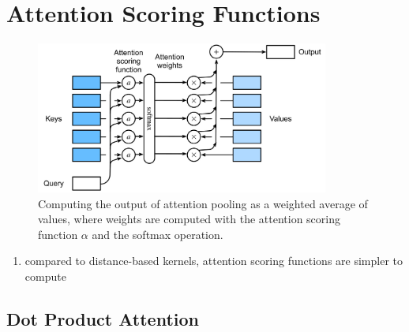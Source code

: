 \section{Attention Scoring Functions \cite{dnn-1}} \label{Attention Scoring Functions}

\begin{figure}[H]
    \centering
    \includegraphics[width=\linewidth, height=5cm, keepaspectratio]{Pictures/deep_neural_networks/Attention-Scoring-Function.jpg}
    \caption*{Computing the output of attention pooling as a weighted average of values, where weights are computed with the attention scoring function $\alpha$ and the softmax operation.}
\end{figure}

\begin{enumerate}
    \item compared to distance-based kernels, attention scoring functions are simpler to compute

    
\end{enumerate}

\subsection{Dot Product Attention \cite{dnn-1}} \label{Dot Product Attention}

